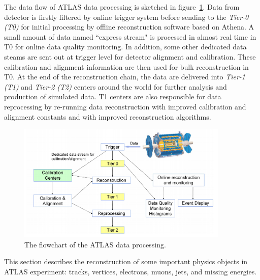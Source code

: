 The data flow of ATLAS data processing is sketched in figure~\ref{fig:data_processing}\cite{Boyd_2010}. 
Data from detector is firstly filtered by online trigger system before sending to the \textit{Tier-0 (T0)} for initial processing by offline reconstruction software based on Athena.
A small amount of data named ``express stream" is processed in almost real time in T0 for online data quality monitoring.
In addition, some other dedicated data steams are sent out at trigger level for detector alignment and calibration.
These calibration and alignment information are then used for bulk reconstruction in T0.
At the end of the reconstruction chain, the data are delivered into \textit{Tier-1 (T1)} and \textit{Tier-2 (T2)} centers around the world for further analysis and production of simulated data.
T1 centers are also responsible for data reprocessing by re-running data reconstruction with improved calibration and alignment constants and with improved reconstruction algorithms.
\begin{figure}[!htb]
  \centering
  \includegraphics[width=0.9\textwidth]{figures/Simulation/data_processing.png}
  \caption{The flowchart of the ATLAS data processing.}
  \label{fig:data_processing}
\end{figure}

This section describes the reconstruction of some important physics objects in ATLAS experiment: tracks, vertices, electrons, muons, jets, and missing energies.







